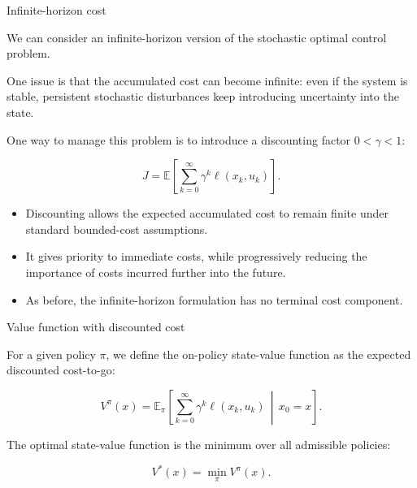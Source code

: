 \documentclass{beamer}
\begin{document}
\begin{frame}{Infinite-horizon cost}
	\begin{flushleft}
		
		{\small 
		We can consider an infinite-horizon version of the stochastic
		optimal control problem.
		
		One issue is that the accumulated cost can become infinite:
		even if the system is stable, persistent stochastic disturbances
		keep introducing uncertainty into the state.
		
		\vspace{0.2cm}
		
		One way to manage this problem is to introduce a discounting
		factor $0 < \gamma < 1$:
		
		\[
		\boxed{
			J = \mathbb{E}\left[
			\sum_{k=0}^{\infty}
			\gamma^k \ell(x_k,u_k)
			\right].
		}
		\]
		
		\vspace{0.2cm}
		
		\begin{itemize}
			\item Discounting allows the expected accumulated cost to remain
			finite under standard bounded-cost assumptions.
			
			\item It gives priority to immediate costs, while progressively
			reducing the importance of costs incurred further into the future.
			
			\item As before, the infinite-horizon formulation has no terminal
			cost component.
		\end{itemize}
	}
	\end{flushleft}
\end{frame}


\begin{frame}{Value function with discounted cost}
	\begin{flushleft}
		
		For a given policy $\pi$, we define the on-policy state-value
		function as the expected discounted cost-to-go:
		
		\[
		V^\pi(x) =
		\mathbb{E}_\pi\left[
		\sum_{k=0}^{\infty}
		\gamma^k \ell(x_k,u_k)
		\,\middle|\, x_0=x
		\right].
		\]
		
		\vspace{0.3cm}
		
		The optimal state-value function is the minimum over all
		admissible policies:
		
		\[
		V^*(x)=\min_\pi V^\pi(x).
		\]
		
	\end{flushleft}
\end{frame}
\end{document}
